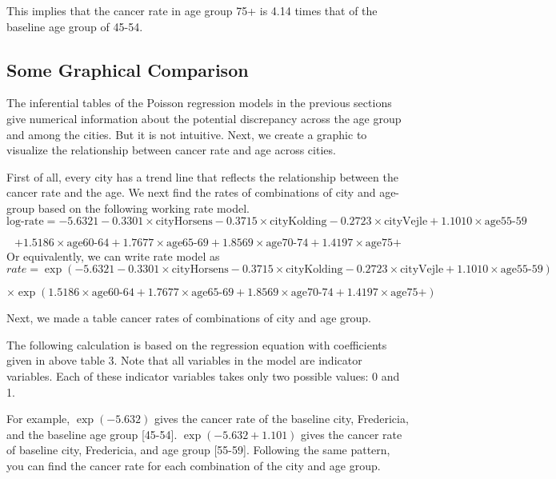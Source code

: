\documentclass[
]{book}
\begin{document}
This implies that the cancer rate in age group 75+ is 4.14 times that of the baseline age group of 45-54.

\hypertarget{some-graphical-comparison}{%
\subsection{Some Graphical Comparison}\label{some-graphical-comparison}}

The inferential tables of the Poisson regression models in the previous sections give numerical information about the potential discrepancy across the age group and among the cities. But it is not intuitive. Next, we create a graphic to visualize the relationship between cancer rate and age across cities.

First of all, every city has a trend line that reflects the relationship between the cancer rate and the age. We next find the rates of combinations of city and age-group based on the following working rate model.
\[
\text{log-rate} = -5.6321 -0.3301 \times \text{cityHorsens} -0.3715 \times \text{cityKolding} -0.2723 \times \text{cityVejle} + 1.1010 \times \text{age55-59}
\]

\[
+ 1.5186 \times \text{age60-64} + 1.7677 \times  \text{age65-69} + 1.8569 \times \text{age70-74} + 1.4197 \times \text{age75+}
\]
Or equivalently, we can write rate model as
\[
rate =\exp(-5.6321 -0.3301 \times \text{cityHorsens} -0.3715 \times \text{cityKolding} -0.2723 \times \text{cityVejle} + 1.1010 \times \text{age55-59}) 
\]

\[
\times \exp( 1.5186 \times \text{age60-64} + 1.7677 \times  \text{age65-69} + 1.8569 \times \text{age70-74} + 1.4197 \times \text{age75+})
\]

Next, we made a table cancer rates of combinations of city and age group.

The following calculation is based on the regression equation with coefficients given in above table 3. Note that all variables in the model are indicator variables. Each of these indicator variables takes only two possible values: 0 and 1.

For example, \(\exp(-5.632)\) gives the cancer rate of the baseline city, Fredericia, and the baseline age group {[}45-54{]}. \(\exp(-5.632+1.101)\) gives the cancer rate of baseline city, Fredericia, and age group {[}55-59{]}. Following the same pattern, you can find the cancer rate for each combination of the city and age group.
\end{document}

